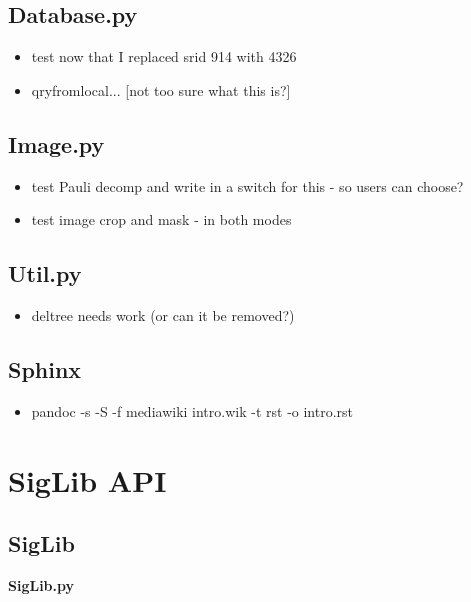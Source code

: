 \documentclass[letterpaper,10pt,english]{sphinxmanual}
\begin{document}
\section{Database.py}
\label{todo:database-py}\begin{itemize}
\item {} 
test now that I replaced srid 914 with 4326

\item {} 
qryfromlocal... {[}not too sure what this is?{]}

\end{itemize}


\section{Image.py}
\label{todo:image-py}\begin{itemize}
\item {} 
test Pauli decomp and write in a switch for this - so users can
choose?

\item {} 
test image crop and mask - in both modes

\end{itemize}


\section{Util.py}
\label{todo:util-py}\begin{itemize}
\item {} 
deltree needs work (or can it be removed?)

\end{itemize}


\section{Sphinx}
\label{todo:sphinx}\begin{itemize}
\item {} 
pandoc -s -S -f mediawiki intro.wik -t rst -o intro.rst

\end{itemize}


\chapter{SigLib API}
\label{code:siglib-api}\label{code::doc}

\section{SigLib}
\label{code:module-SigLib}\label{code:siglib}
\textbf{SigLib.py}
\end{document}
